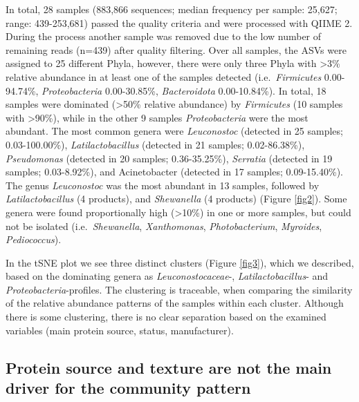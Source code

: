 \documentclass[preprint,3p,
a4paper]{elsarticle} %
\begin{document}
In total, 28 samples (883,866 sequences; median frequency per sample:
25,627; range: 439-253,681) passed the quality criteria and were
processed with QIIME 2. During the process another sample was removed
due to the low number of remaining reads (n=439) after quality
filtering. Over all samples, the ASVs were assigned to 25 different
Phyla, however, there were only three Phyla with \textgreater3\%
relative abundance in at least one of the samples detected
(i.e.~\emph{Firmicutes} 0.00-94.74\%, \emph{Proteobacteria}
0.00-30.85\%, \emph{Bacteroidota} 0.00-10.84\%). In total, 18 samples
were dominated (\textgreater50\% relative abundance) by
\emph{Firmicutes} (10 samples with \textgreater90\%), while in the other
9 samples \emph{Proteobacteria} were the most abundant. The most common
genera were \emph{Leuconostoc} (detected in 25 samples; 0.03-100.00\%),
\emph{Latilactobacillus} (detected in 21 samples; 0.02-86.38\%),
\emph{Pseudomonas} (detected in 20 samples; 0.36-35.25\%),
\emph{Serratia} (detected in 19 samples; 0.03-8.92\%), and Acinetobacter
(detected in 17 samples; 0.09-15.40\%). The genus \emph{Leuconostoc} was
the most abundant in 13 samples, followed by \emph{Latilactobacillus} (4
products), and \emph{Shewanella} (4 products) (Figure \ref{fig2}). Some
genera were found proportionally high (\textgreater10\%) in one or more
samples, but could not be isolated (i.e.~\emph{Shewanella},
\emph{Xanthomonas}, \emph{Photobacterium}, \emph{Myroides},
\emph{Pediococcus}).

In the tSNE plot we see three distinct clusters (Figure \ref{fig3}),
which we described, based on the dominating genera as
\emph{Leuconostocaceae}-, \emph{Latilactobacillus}- and
\emph{Proteobacteria}-profiles. The clustering is traceable, when
comparing the similarity of the relative abundance patterns of the
samples within each cluster. Although there is some clustering, there is
no clear separation based on the examined variables (main protein
source, status, manufacturer).

\hypertarget{protein-source-and-texture-are-not-the-main-driver-for-the-community-pattern}{%
\subsection{Protein source and texture are not the main driver for the
community
pattern}\label{protein-source-and-texture-are-not-the-main-driver-for-the-community-pattern}}
\end{document}
